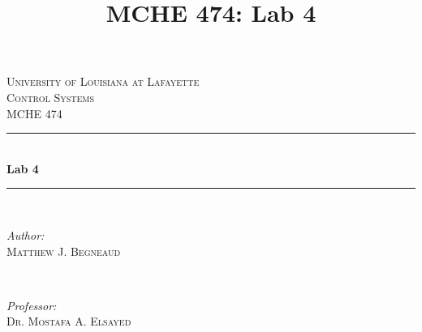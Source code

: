 \documentclass[12pt]{article}
\title{MCHE 474: Lab 4}
\begin{document}




\begin{titlepage}

\newcommand{\HRule}{\rule{\linewidth}{0.5mm}} %

\center %
 

\textsc{\LARGE University of Louisiana at Lafayette}\\[1.5cm] %
\textsc{\Large Control Systems}\\[0.5cm] %
\textsc{\large MCHE 474}\\[0.5cm] %


\HRule \\[0.4cm]
{ \huge \bfseries Lab 4}\\[0.4cm] %
\HRule \\[1.5cm]
 

\begin{minipage}{0.4\textwidth}
\begin{flushleft} \large
\emph{Author:}\\
\textsc{Matthew J. Begneaud} \\%
\end{flushleft}
\end{minipage}
~
\begin{minipage}{0.4\textwidth}
\begin{flushright} \large
\emph{Professor:} \\
\textsc{Dr. Mostafa A. Elsayed} %
\end{flushright}
\end{minipage}\\[1.5cm]


\end{titlepage}
\end{document}
